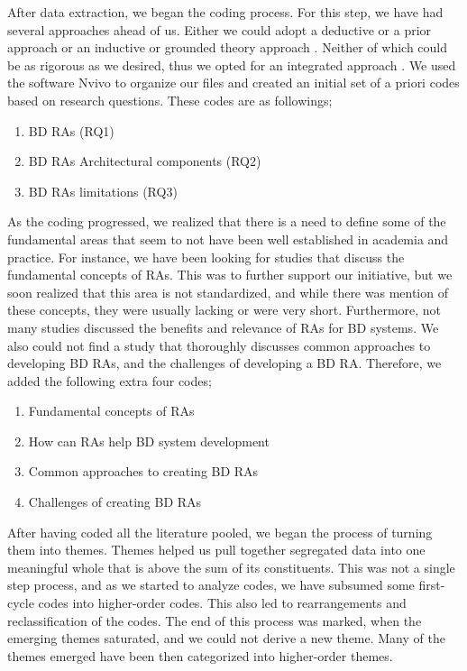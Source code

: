 \documentclass{ieeeaccess}
\begin{document}
After data extraction, we began the coding process. For this step, we have had several approaches ahead of us. Either we could adopt a deductive or a prior approach \cite{miles1994qualitative} or an inductive or grounded theory approach \cite{corbin2014basics}. Neither of which could be as rigorous as we desired, thus we opted for an integrated approach \cite{lofland1971analyzing}. We used the software Nvivo to organize our files and created an initial set of a priori codes based on research questions. These codes are as followings;

\begin{enumerate}
    \item BD RAs (RQ1)
    \item BD RAs Architectural components (RQ2)
    \item BD RAs limitations (RQ3)
\end{enumerate}

As the coding progressed, we realized that there is a need to define some of the fundamental areas that seem to not have been well established in academia and practice. For instance, we have been looking for studies that discuss the fundamental concepts of RAs. This was to further support our initiative, but we soon realized that this area is not standardized, and while there was mention of these concepts, they were usually lacking or were very short. Furthermore, not many studies discussed the benefits and relevance of RAs for BD systems. We also could not find a study that thoroughly discusses common approaches to developing BD RAs, and the challenges of developing a BD RA. Therefore, we added the following extra four codes;

\begin{enumerate}
    \item Fundamental concepts of RAs
    \item How can RAs help BD system development
    \item Common approaches to creating BD RAs
    \item Challenges of creating BD RAs
\end{enumerate}

After having coded all the literature pooled, we began the process of turning them into themes. Themes helped us pull together segregated data into one meaningful whole that is above the sum of its constituents. This was not a single step process, and as we started to analyze codes, we have subsumed some first-cycle codes into higher-order codes. This also led to rearrangements and reclassification of the codes. The end of this process was marked, when the emerging themes saturated, and we could not derive a new theme. Many of the themes emerged have been then categorized into higher-order themes. 
\end{document}
